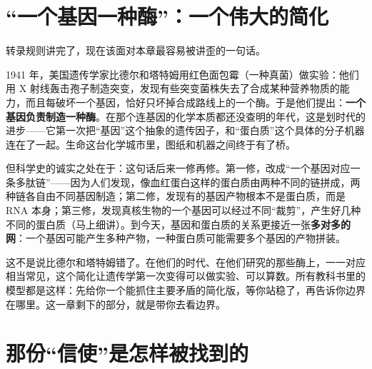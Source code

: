 \section{“一个基因一种酶”：一个伟大的简化}

转录规则讲完了，现在该面对本章最容易被讲歪的一句话。

1941 年，美国遗传学家比德尔和塔特姆用红色面包霉（一种真菌）做实验：他们用 X 射线轰击孢子制造突变，发现有些突变菌株失去了合成某种营养物质的能力，而且每破坏一个基因，恰好只坏掉合成路线上的一个酶。于是他们提出：\textbf{一个基因负责制造一种酶}。在那个连基因的化学本质都还没查明的年代，这是划时代的进步——它第一次把“基因”这个抽象的遗传因子，和“蛋白质”这个具体的分子机器连在了一起。生命这台化学城市里，图纸和机器之间终于有了桥。

但科学史的诚实之处在于：这句话后来一修再修。第一修，改成“一个基因对应一条多肽链”——因为人们发现，像血红蛋白这样的蛋白质由两种不同的链拼成，两种链各自由不同基因制造；第二修，发现有的基因产物根本不是蛋白质，而是 RNA 本身；第三修，发现真核生物的一个基因可以经过不同“裁剪”，产生好几种不同的蛋白质（马上细讲）。到今天，基因和蛋白质的关系更接近一张\textbf{多对多的网}：一个基因可能产生多种产物，一种蛋白质可能需要多个基因的产物拼装。

这不是说比德尔和塔特姆错了。在他们的时代、在他们研究的那些酶上，一一对应相当常见，这个简化让遗传学第一次变得可以做实验、可以算数。所有教科书里的模型都是这样：先给你一个能抓住主要矛盾的简化版，等你站稳了，再告诉你边界在哪里。这一章剩下的部分，就是带你去看边界。

\section{那份“信使”是怎样被找到的}

